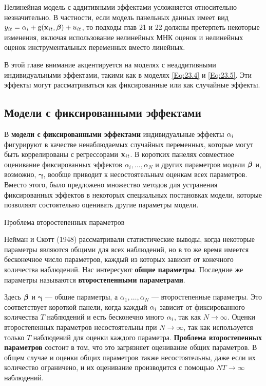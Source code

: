 Нелинейная модель с аддитивными эффектами усложняется относительно незначительно. В частности, если модель панельных данных имеет вид $y_{it}=\alpha_i+\mathrm g(\mathbf{x}_{it},\bm{\beta})+u_{it}$, то подходы глав 21 и 22 должны претерпеть некоторые изменения, включая использование нелинейных МНК оценок и нелинейных оценок инструментальных переменных вместо линейных.

В этой главе внимание акцентируется на моделях с неаддитивными индивидуальными эффектами, такими как в моделях \ref{Eq:23.4} и \ref{Eq:23.5}. Эти эффекты могут рассматриваться как фиксированные или как случайные эффекты.

\subsection{Модели с фиксированными эффектами}

В \textbf{модели с фиксированными эффектами} индивидуальные эффекты $\alpha_i$ фигурируют в качестве ненаблюдаемых случайных переменных, которые могут быть коррелированы с регрессорами $\mathbf{x}_{it}$. В коротких панелях совместное оценивание фиксированных эффектов $\alpha_i, \dots, \alpha_N$ и других параметров модели $\bm{\beta}$ и, возможно, $\bm\gamma$, вообще приводит к несостоятельным оценкам всех параметров. Вместо этого, было предложено множество методов для устранения фиксированных эффектов в некоторых специальных постановках модели, которые позволяют состоятельно оценивать другие параметры модели.

 {\centering Проблема второстепенных параметров\\}
 
Нейман и Скотт (1948) рассматривали статистические выводы, когда некоторые параметры являются общими для всех наблюдений, но в то же время имеется бесконечное число параметров, каждый из которых зависит от конечного количества наблюдений. Нас интересуют \textbf{общие параметры}. Последние же параметры называются \textbf{второстепенными параметрами}.

Здесь $\bm{\beta}$ и $\bm\gamma$ --- общие параметры, а $\alpha_1, \dots, \alpha_N$ --- второстепенные параметры. Это соответствует короткой панели, когда каждый $\alpha_i$  зависит от фиксированного количества $T$ наблюдений и есть бесконечно много $\alpha_i$, так как $N \rightarrow \infty$. Оценки второстепенных параметров несостоятельны при $N \rightarrow \infty$, так как используется только $T$ наблюдений для оценки каждого параметра. \textbf{Проблема второстепенных параметров} состоит в том, что это загрязняет оценивание общих параметров. В общем случае и оценки общих параметров также несостоятельны, даже если их количество ограничено, и их оценивание производится с помощью $NT \rightarrow \infty$ наблюдений.

